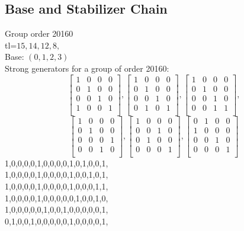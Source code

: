 \subsection*{Base and Stabilizer Chain}
Group order 20160\\
tl=$15, 14, 12, 8, $\\
Base: $( 0, 1, 2, 3 )$\\
{\small\arraycolsep=2pt
Strong generators for a group of order 20160:
$$
\left[
\begin{array}{*{4}{r}}
1 & 0 & 0 & 0\\
0 & 1 & 0 & 0\\
0 & 0 & 1 & 0\\
1 & 0 & 0 & 1\\
\end{array}
\right]
, 
\left[
\begin{array}{*{4}{r}}
1 & 0 & 0 & 0\\
0 & 1 & 0 & 0\\
0 & 0 & 1 & 0\\
0 & 1 & 0 & 1\\
\end{array}
\right]
, 
\left[
\begin{array}{*{4}{r}}
1 & 0 & 0 & 0\\
0 & 1 & 0 & 0\\
0 & 0 & 1 & 0\\
0 & 0 & 1 & 1\\
\end{array}
\right]
, 
$$
$$
\left[
\begin{array}{*{4}{r}}
1 & 0 & 0 & 0\\
0 & 1 & 0 & 0\\
0 & 0 & 0 & 1\\
0 & 0 & 1 & 0\\
\end{array}
\right]
, 
\left[
\begin{array}{*{4}{r}}
1 & 0 & 0 & 0\\
0 & 0 & 1 & 0\\
0 & 1 & 0 & 0\\
0 & 0 & 0 & 1\\
\end{array}
\right]
, 
\left[
\begin{array}{*{4}{r}}
0 & 1 & 0 & 0\\
1 & 0 & 0 & 0\\
0 & 0 & 1 & 0\\
0 & 0 & 0 & 1\\
\end{array}
\right]
$$
1,0,0,0,0,1,0,0,0,0,1,0,1,0,0,1,\\
1,0,0,0,0,1,0,0,0,0,1,0,0,1,0,1,\\
1,0,0,0,0,1,0,0,0,0,1,0,0,0,1,1,\\
1,0,0,0,0,1,0,0,0,0,0,1,0,0,1,0,\\
1,0,0,0,0,0,1,0,0,1,0,0,0,0,0,1,\\
0,1,0,0,1,0,0,0,0,0,1,0,0,0,0,1,\\
}

